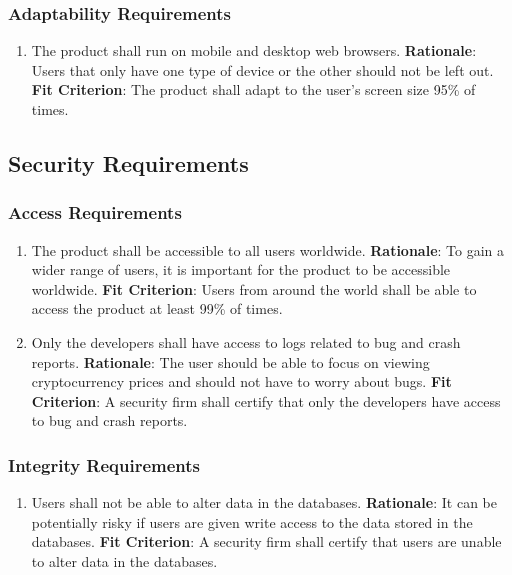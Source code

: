 \documentclass[12pt, titlepage]{article}
\begin{document}
\subsubsection{Adaptability Requirements}
\begin{enumerate}[nfr]
    \item The product shall run on mobile and desktop web browsers.
    \newline \textbf{Rationale}: Users that only have one type of device or the other should not be left out.
    \newline \textbf{Fit Criterion}: The product shall adapt to the user's screen size 95\% of times.
\end{enumerate}

\subsection{Security Requirements}
\subsubsection{Access Requirements}
\begin{enumerate}[nfr]
    \item The product shall be accessible to all users worldwide.
    \newline \textbf{Rationale}: To gain a wider range of users, it is important for the product to be accessible worldwide.
    \newline \textbf{Fit Criterion}: Users from around the world shall be able to access the product at least 99\% of times.
    \item Only the developers shall have access to logs related to bug and crash reports.
    \newline \textbf{Rationale}: The user should be able to focus on viewing cryptocurrency prices and should not have to worry about bugs.
    \newline \textbf{Fit Criterion}: A security firm shall certify that only the developers have access to bug and crash reports.
\end{enumerate}

\subsubsection{Integrity Requirements}
\begin{enumerate}[nfr]
    \item Users shall not be able to alter data in the databases.
    \newline \textbf{Rationale}: It can be potentially risky if users are given write access to the data stored in the databases.
    \newline \textbf{Fit Criterion}: A security firm shall certify that users are unable to alter data in the databases.
\end{enumerate}
\end{document}
